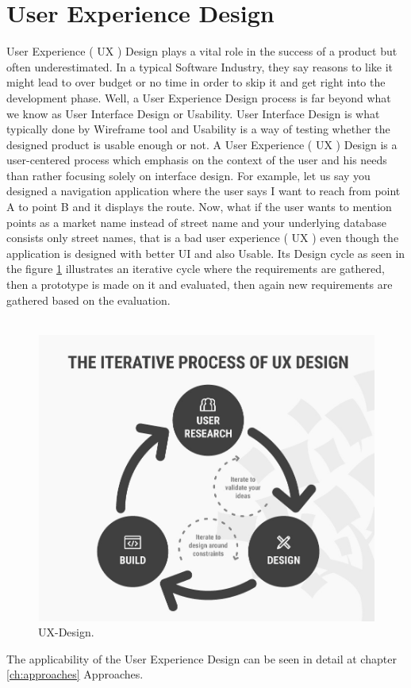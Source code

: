\section{User Experience Design} 

User Experience ( UX ) Design plays a vital role in the success of a product but often underestimated. In a typical Software Industry, they say reasons to like it might lead to over budget or no time in order to skip it and get right into the development phase. Well, a User Experience Design process is far beyond what we know as User Interface Design or Usability.  User Interface Design is what typically done by Wireframe tool and Usability is a way of testing whether the designed product is usable enough or not. A User Experience ( UX ) Design is a user-centered process which emphasis on the context of the user and his needs than rather focusing solely on interface design. \cite{UX} For example, let us say you designed a navigation application where the user says I want to reach from point A to point B and it displays the route. Now, what if the user wants to mention points as a market name instead of street name and your underlying database consists only street names, that is a bad user experience ( UX ) even though the application is designed with better UI and also Usable. Its Design \cite{UXD} cycle as seen in the figure \ref{fig:ux-design} illustrates an iterative cycle where the requirements are gathered, then a prototype is made on it and evaluated, then again new requirements are gathered based on the evaluation. \\ \\

\begin{figure}[hbt!]
	\centering
	\includegraphics[width=\linewidth]{figures/ux-design}
	\caption{UX-Design.\cite{UXD}}
	\label{fig:ux-design}
\end{figure}

The applicability of the User Experience Design can be seen in detail at chapter \ref{ch:approaches} Approaches. 



\let\cleardoublepage\clearpage
